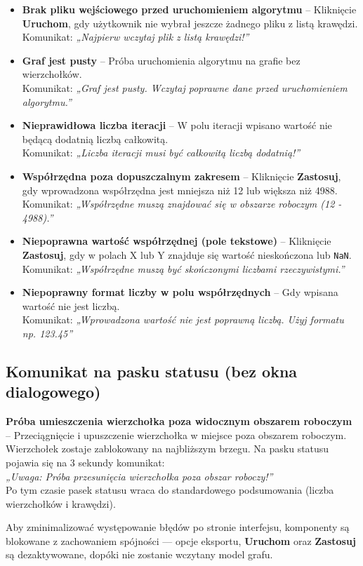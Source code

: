 \documentclass[a4paper, 11pt]{article}
\begin{document}
\begin{itemize}
  \item \textbf{Brak pliku wejściowego przed uruchomieniem algorytmu} – Kliknięcie \textbf{Uruchom}, gdy użytkownik nie wybrał jeszcze żadnego pliku z listą krawędzi.\\
  Komunikat: \textit{„Najpierw wczytaj plik z listą krawędzi!”}

  \item \textbf{Graf jest pusty} – Próba uruchomienia algorytmu na grafie bez wierzchołków.\\
  Komunikat: \textit{„Graf jest pusty. Wczytaj poprawne dane przed uruchomieniem algorytmu.”}

  \item \textbf{Nieprawidłowa liczba iteracji} – W polu iteracji wpisano wartość nie będącą dodatnią liczbą całkowitą.\\
  Komunikat: \textit{„Liczba iteracji musi być całkowitą liczbą dodatnią!”}

  \item \textbf{Współrzędna poza dopuszczalnym zakresem} – Kliknięcie \textbf{Zastosuj}, gdy wprowadzona współrzędna jest mniejsza niż 12 lub większa niż 4988.\\
  Komunikat: \textit{„Współrzędne muszą znajdować się w obszarze roboczym (12 - 4988).”}

  \item \textbf{Niepoprawna wartość współrzędnej (pole tekstowe)} – Kliknięcie \textbf{Zastosuj}, gdy w polach X lub Y znajduje się wartość nieskończona lub \texttt{NaN}.\\
  Komunikat: \textit{„Współrzędne muszą być skończonymi liczbami rzeczywistymi.”}

  \item \textbf{Niepoprawny format liczby w polu współrzędnych} – Gdy wpisana wartość nie jest liczbą.\\
  Komunikat: \textit{„Wprowadzona wartość nie jest poprawną liczbą. Użyj formatu np. 123.45”}
\end{itemize}

\subsection*{Komunikat na pasku statusu (bez okna dialogowego)}

\textbf{Próba umieszczenia wierzchołka poza widocznym obszarem roboczym} – Przeciągnięcie i upuszczenie wierzchołka w miejsce poza obszarem roboczym. Wierzchołek zostaje zablokowany na najbliższym brzegu. Na pasku statusu pojawia się na 3 sekundy komunikat: \\
\textit{„Uwaga: Próba przesunięcia wierzchołka poza obszar roboczy!”} \\
Po tym czasie pasek statusu wraca do standardowego podsumowania (liczba wierzchołków i krawędzi).

Aby zminimalizować występowanie błędów po stronie interfejsu, komponenty są blokowane z zachowaniem spójności --- opcje eksportu, \textbf{Uruchom} oraz \textbf{Zastosuj} są dezaktywowane, dopóki nie zostanie wczytany model grafu.
\end{document}
